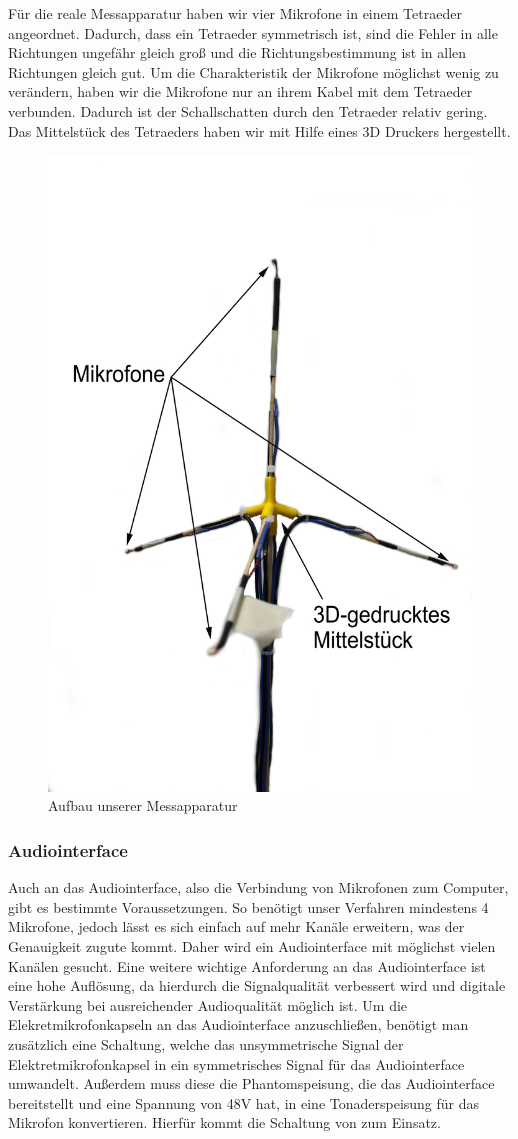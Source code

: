 Für die reale Messapparatur haben wir vier Mikrofone in einem Tetraeder angeordnet. Dadurch, dass ein Tetraeder symmetrisch ist, sind die Fehler in alle Richtungen ungefähr gleich groß und die Richtungsbestimmung ist in allen Richtungen gleich gut. Um die Charakteristik der Mikrofone möglichst wenig zu verändern, haben wir die Mikrofone nur an ihrem Kabel mit dem Tetraeder verbunden. Dadurch ist der Schallschatten durch den Tetraeder relativ gering. Das Mittelstück des Tetraeders haben wir mit Hilfe eines 3D Druckers hergestellt.
\begin{figure}[H]
  \begin{center}
    \includegraphics[width=0.35\linewidth]{img/tet}
  \end{center}
  \caption{Aufbau unserer Messapparatur}
\end{figure}
\subsubsection{Audiointerface}
Auch an das Audiointerface, also die Verbindung von Mikrofonen zum Computer, gibt es bestimmte Voraussetzungen. So benötigt unser Verfahren mindestens 4 Mikrofone, jedoch lässt es sich einfach auf mehr Kanäle erweitern, was der Genauigkeit zugute kommt. Daher wird ein Audiointerface mit möglichst vielen Kanälen gesucht. Eine weitere wichtige Anforderung an das Audiointerface ist eine hohe Auflösung, da hierdurch die Signalqualität verbessert wird und digitale Verstärkung bei ausreichender Audioqualität möglich ist. Um die Elekretmikrofonkapseln an das Audiointerface anzuschließen, benötigt man zusätzlich eine Schaltung, welche das unsymmetrische Signal der Elektretmikrofonkapsel in ein symmetrisches Signal für das Audiointerface umwandelt. Außerdem muss diese die Phantomspeisung, die das Audiointerface bereitstellt und eine Spannung von 48V hat, in eine Tonaderspeisung für das Mikrofon konvertieren. Hierfür kommt die Schaltung von \cite{Powering_microphones} zum Einsatz.

